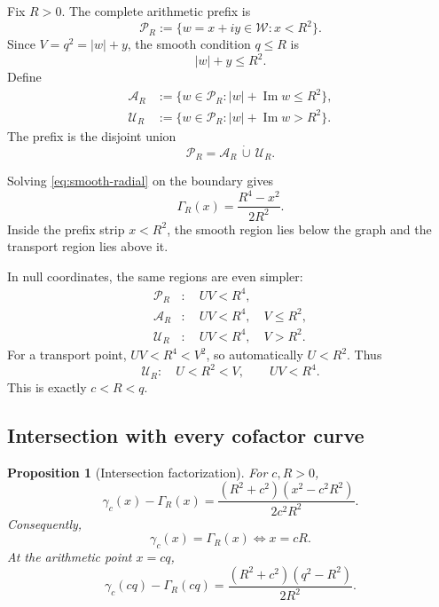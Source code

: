 \documentclass[11pt]{article}
\newtheorem{proposition}[theorem]{Proposition}
\theoremstyle{definition}
\theoremstyle{remark}
\newcommand{\1}{\mathbf{1}}
\newcommand{\Impart}{\operatorname{Im}}
\begin{document}
Fix $R>0$.  The complete arithmetic prefix is
\begin{equation}
 \mathscr P_R
 :=\{w=x+iy\in\mathscr W:x<R^2\}.
 \label{eq:prefix-region}
\end{equation}
Since $V=q^2=|w|+y$, the smooth condition $q\le R$ is
\begin{equation}
 |w|+y\le R^2.
 \label{eq:smooth-radial}
\end{equation}
Define
\begin{align}
 \mathscr A_R
 &:={\{w\in\mathscr P_R:|w|+\Impart w\le R^2\}},
 \label{eq:A-region}\\
 \mathscr U_R
 &:={\{w\in\mathscr P_R:|w|+\Impart w>R^2\}}.
 \label{eq:U-region}
\end{align}
The prefix is the disjoint union
\begin{equation}
 \mathscr P_R=\mathscr A_R\,\dot\cup\,\mathscr U_R.
 \label{eq:region-partition}
\end{equation}

Solving \cref{eq:smooth-radial} on the boundary gives
\begin{equation}
 \boxed{
 \Gamma_R(x)=\frac{R^4-x^2}{2R^2}.
 }
 \label{eq:Gamma-R}
\end{equation}
Inside the prefix strip $x<R^2$, the smooth region lies below the graph and the transport region lies above it.

In null coordinates, the same regions are even simpler:
\begin{align}
 \mathscr P_R&:\quad UV<R^4,
 \label{eq:prefix-UV}\\
 \mathscr A_R&:\quad UV<R^4,\quad V\le R^2,
 \label{eq:smooth-UV}\\
 \mathscr U_R&:\quad UV<R^4,\quad V>R^2.
 \label{eq:transport-UV}
\end{align}
For a transport point, $UV<R^4<V^2$, so automatically $U<R^2$.  Thus
\begin{equation}
 \mathscr U_R:\quad U<R^2<V,
 \qquad
 UV<R^4.
 \label{eq:transport-null-clean}
\end{equation}
This is exactly $c<R<q$.

\subsection{Intersection with every cofactor curve}

\begin{proposition}[Intersection factorization]
\label{prop:intersection-factorization}
For $c,R>0$,
\begin{equation}
 \gamma_c(x)-\Gamma_R(x)
 =
 \frac{(R^2+c^2)(x^2-c^2R^2)}{2c^2R^2}.
 \label{eq:curve-gap}
\end{equation}
Consequently,
\begin{equation}
 \gamma_c(x)=\Gamma_R(x)
 \iff x=cR.
 \label{eq:curve-intersection}
\end{equation}
At the arithmetic point $x=cq$,
\begin{equation}
 \gamma_c(cq)-\Gamma_R(cq)
 =
 \frac{(R^2+c^2)(q^2-R^2)}{2R^2}.
 \label{eq:point-gap}
\end{equation}
\end{proposition}
\end{document}
